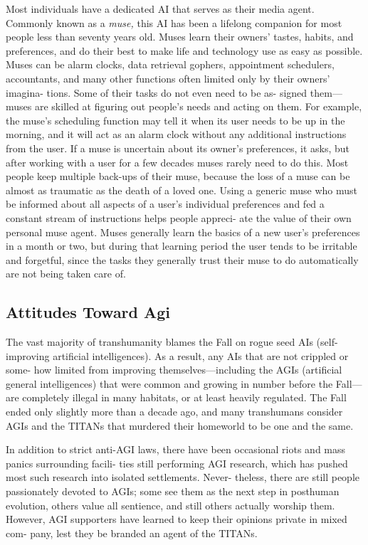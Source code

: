 Most individuals have a dedicated AI that serves as 
their media agent. Commonly known as a \textit{muse,} this 
AI has been a lifelong companion for most people 
less than seventy years old. Muses learn their owners' 
tastes, habits, and preferences, and do their best to 
make life and technology use as easy as possible. 
Muses can be alarm clocks, data retrieval gophers, 
appointment schedulers, accountants, and many other 
functions often limited only by their owners' imagina-
tions. Some of their tasks do not even need to be as-
signed them—muses are skilled at figuring out people's 
needs and acting on them. For example, the muse's 
scheduling function may tell it when its user needs to 
be up in the morning, and it will act as an alarm clock 
without any additional instructions from the user. If a 
muse is uncertain about its owner's preferences, it asks, 
but after working with a user for a few decades muses 
rarely need to do this. Most people keep multiple 
back-ups of their muse, because the loss of a muse 
can be almost as traumatic as the death of a loved one. 
Using a generic muse who must be informed about 
all aspects of a user's individual preferences and fed a 
constant stream of instructions helps people appreci-
ate the value of their own personal muse agent. Muses 
generally learn the basics of a new user's preferences 
in a month or two, but during that learning period the 
user tends to be irritable and forgetful, since the tasks 
they generally trust their muse to do automatically are 
not being taken care of.

\subsection{Attitudes Toward Agi}

The vast majority of transhumanity blames the Fall on 
rogue seed AIs (self-improving artificial intelligences). 
As a result, any AIs that are not crippled or some-
how limited from improving themselves—including 
the AGIs (artificial general intelligences) that were 
common and growing in number before the Fall—are 
completely illegal in many habitats, or at least heavily 
regulated. The Fall ended only slightly more than a 
decade ago, and many transhumans consider AGIs 
and the TITANs that murdered their homeworld to 
be one and the same. 

In addition to strict anti-AGI laws, there have been 
occasional riots and mass panics surrounding facili-
ties still performing AGI research, which has pushed 
most such research into isolated settlements. Never-
theless, there are still people passionately devoted to 
AGIs; some see them as the next step in posthuman 
evolution, others value all sentience, and still others 
actually worship them. However, AGI supporters have 
learned to keep their opinions private in mixed com-
pany, lest they be branded an agent of the TITANs.

